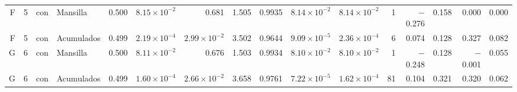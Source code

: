 \documentclass[11pt,letterpaper]{article}
\begin{document}
\begin{table}[H]
\begin{adjustbox}{max width=\textwidth}
\begin{tabular}{rrllrrrrrrrrrrrr}
F & 5 & con & Mansilla & 0.500 & $8.15\times10^{-2}$ & 0.681 & 1.505 & 0.9935 & $8.14\times10^{-2}$ & $8.14\times10^{-2}$ & 1 & $-$0.276 & 0.158 & 0.000 & 0.000 \\
F & 5 & con & Acumulados & 0.499 & $2.19\times10^{-4}$ & $2.99\times10^{-2}$ & 3.502 & 0.9644 & $9.09\times10^{-5}$ & $2.36\times10^{-4}$ & 6 & 0.074 & 0.128 & 0.327 & 0.082 \\
G & 6 & con & Mansilla & 0.500 & $8.11\times10^{-2}$ & 0.676 & 1.503 & 0.9934 & $8.10\times10^{-2}$ & $8.10\times10^{-2}$ & 1 & $-$0.248 & 0.128 & $-$0.001 & 0.055 \\
G & 6 & con & Acumulados & 0.499 & $1.60\times10^{-4}$ & $2.66\times10^{-2}$ & 3.658 & 0.9761 & $7.22\times10^{-5}$ & $1.62\times10^{-4}$ & 81 & 0.104 & 0.321 & 0.320 & 0.062 \\
\bottomrule
\end{tabular}
\end{adjustbox}
\end{table}
\end{document}

